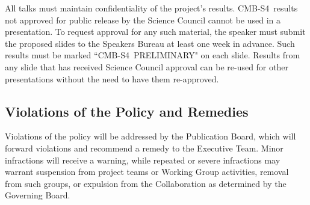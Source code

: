 \documentclass[12pt]{article}
\newcommand\collabname{CMB-S4}
\begin{document}
{%


All talks must maintain confidentiality of the project's results. \collabname\ results not approved for public release by the Science Council cannot be used in a presentation. To request approval for any such material, the speaker must submit the proposed slides to the Speakers Bureau at least one week in advance. Such results must be marked ``\collabname\ PRELIMINARY" on each slide. Results from any slide that has received Science Council approval can be re-used for other presentations without the need to have them re-approved. %

}

\subsection{Violations of the Policy and Remedies}
Violations of the policy will be addressed by the Publication Board, which will forward violations and recommend a remedy to the Executive Team.  Minor infractions will receive a warning, while repeated or severe infractions may warrant suspension from project teams or Working Group activities, removal from such groups, or expulsion from the Collaboration as determined by the Governing Board.
\end{document}
